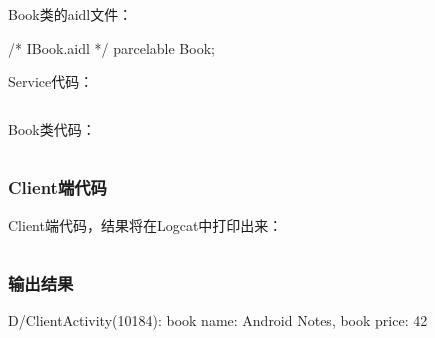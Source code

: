 ﻿\documentclass[a4paper,11pt]{article}
\begin{document}
  Book类的aidl文件：\par
  \begin{javacode}
/* IBook.aidl */
parcelable Book;
  \end{javacode}

  Service代码：\par
  \inputminted[linenos,tabsize=4,bgcolor=srcbg]{java}{AIDLServerService.java}

  Book类代码：\par
  \inputminted[linenos,tabsize=4,bgcolor=srcbg]{java}{Book.java}

  \subsubsection[Client端代码]{Client端代码}
  Client端代码，结果将在Logcat中打印出来：\par
  \inputminted[linenos,tabsize=4,bgcolor=srcbg]{java}{ClientActivity.java}

  \subsubsection[输出结果]{输出结果}
  \begin{bashcode}
D/ClientActivity(10184): book name: Android Notes, book price: 42
  \end{bashcode}
\end{document}
